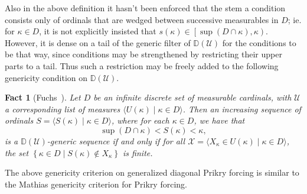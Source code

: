 \documentclass{amsart}
\newtheorem{fact}[theorem]{Fact}
\theoremstyle{definition}
\theoremstyle{remark}
\newcommand{\D}{\mathbb{D}}
\newcommand{\U}{\mathcal{U}}
\newcommand{\st}{\; | \;}
\newcommand{\set}[2]{\left\{#1\st #2 \right\}}
\newcommand{\seq}[2]{\langle #1 \st #2 \rangle}
\begin{document}
Also in the above definition it hasn't been enforced that the stem a condition consists only of ordinals that are wedged between successive measurables in $D$; ie. for $\kappa \in D$, it is not explicitly insisted that $s(\kappa) \in \left[\sup(D\cap \kappa), \kappa\right)$. However, it is dense on a tail of the generic filter of $\D(\U)$ for the conditions to be that way, since conditions may be strengthened by restricting their upper parts to a tail. 
Thus such a restriction may be freely added to the following genericity condition on $\D(\U)$.

\begin{fact}[Fuchs~\cite{Fuchs:2005kx}] \label{fact:diagprikrymathias} Let $D$ be an infinite discrete set of measurable cardinals, with $\U$ a corresponding list of measures $\langle U(\kappa) \;|\; \kappa \in D \rangle$. Then an increasing sequence of ordinals $S = \langle S(\kappa) \;|\; \kappa \in D \rangle$, where for each $\kappa \in D$, we have that $$\sup(D \cap \kappa) < S(\kappa) < \kappa,$$ is a $\D(\U)$-generic  sequence if and only if for all $\mathcal X = \seq{ X_\kappa \in U(\kappa) }{ \kappa \in D }$, the set $\set{ \kappa \in D }{ S(\kappa) \notin X_\kappa }$ is finite.
\end{fact}

The above genericity criterion on generalized diagonal Prikry forcing is similar to the Mathias genericity criterion for Prikry forcing.
\end{document}
